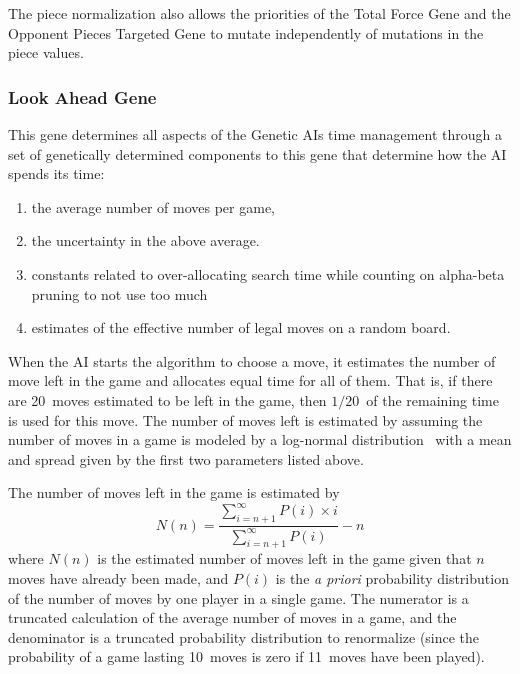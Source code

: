 \documentclass[letterpaper]{article}
\renewcommand{\_}{\allowbreak\textunderscore\allowbreak}
\begin{document}
The piece normalization also allows the priorities of the Total Force Gene and the Opponent Pieces Targeted Gene to mutate independently of mutations in the piece values.

\subsubsection{Look Ahead Gene}\label{look-ahead}
This gene determines all aspects of the Genetic AIs time management through a set of genetically determined components to this gene that determine how the AI spends its time:
\begin{enumerate}
	\item the average number of moves per game,
	\item the uncertainty in the above average.
	\item constants related to over-allocating search time while counting on alpha-beta pruning to not use too much
	\item estimates of the effective number of legal moves on a random board.
\end{enumerate}
When the AI starts the algorithm to choose a move, it estimates the number of move left in the game and allocates equal time for all of them. That is, if there are 20~moves estimated to be left in the game, then \(1/20\)~of the remaining time is used for this move. The number of moves left is estimated by assuming the number of moves in a game is modeled by a log-normal distribution~\cite{log-norm-wiki}\cite{log-norm-chess-se} with a mean and spread given by the first two parameters listed above.

The number of moves left in the game is estimated by
\[N(n) = \frac{\sum_{i = n + 1}^\infty P(i)\times{}i}{\sum_{i = n + 1}^\infty P(i)} - n\]
where \(N(n)\) is the estimated number of moves left in the game given that \(n\) moves have already been made, and \(P(i)\) is the \emph{a priori} probability distribution of the number of moves by one player in a single game. The numerator is a truncated calculation of the average number of moves in a game, and the denominator is a truncated probability distribution to renormalize (since the probability of a game lasting 10~moves is zero if 11~moves have been played).
\end{document}
